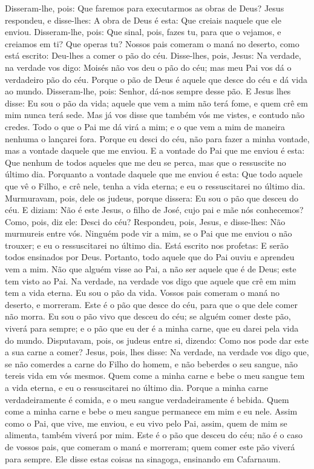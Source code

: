 Disseram-lhe, pois: Que faremos para executarmos as obras de
Deus? Jesus respondeu, e disse-lhes: A obra de Deus é esta:
Que creiais naquele que ele enviou. Disseram-lhe, pois: Que
sinal, pois, fazes tu, para que o vejamos, e creiamos em ti? Que
operas tu? Nossos pais comeram o maná no deserto, como está
escrito: Deu-lhes a comer o pão do céu. Disse-lhes, pois,
Jesus: Na verdade, na verdade vos digo: Moisés não vos deu o pão do
céu; mas meu Pai vos dá o verdadeiro pão do céu. Porque o pão
de Deus é aquele que desce do céu e dá vida ao mundo.
Disseram-lhe, pois: Senhor, dá-nos sempre desse pão. E
Jesus lhes disse: Eu sou o pão da vida; aquele que vem a mim não
terá fome, e quem crê em mim nunca terá sede. Mas já vos
disse que também vós me vistes, e contudo não credes. Todo o
que o Pai me dá virá a mim; e o que vem a mim de maneira nenhuma o
lançarei fora. Porque eu desci do céu, não para fazer a minha
vontade, mas a vontade daquele que me enviou. E a vontade do
Pai que me enviou é esta: Que nenhum de todos aqueles que me deu se
perca, mas que o ressuscite no último dia. Porquanto a
vontade daquele que me enviou é esta: Que todo aquele que vê o
Filho, e crê nele, tenha a vida eterna; e eu o ressuscitarei no
último dia. Murmuravam, pois, dele os judeus, porque dissera:
Eu sou o pão que desceu do céu. E diziam: Não é este Jesus, o
filho de José, cujo pai e mãe nós conhecemos? Como, pois, diz ele:
Desci do céu? Respondeu, pois, Jesus, e disse-lhes: Não
murmureis entre vós. Ninguém pode vir a mim, se o Pai que me
enviou o não trouxer; e eu o ressuscitarei no último dia.
Está escrito nos profetas: E serão todos ensinados por Deus.
Portanto, todo aquele que do Pai ouviu e aprendeu vem a mim.
Não que alguém visse ao Pai, a não ser aquele que é de Deus;
este tem visto ao Pai. Na verdade, na verdade vos digo que
aquele que crê em mim tem a vida eterna. Eu sou o pão da
vida. Vossos pais comeram o maná no deserto, e morreram.
Este é o pão que desce do céu, para que o que dele comer não
morra. Eu sou o pão vivo que desceu do céu; se alguém comer
deste pão, viverá para sempre; e o pão que eu der é a minha carne,
que eu darei pela vida do mundo. Disputavam, pois, os judeus
entre si, dizendo: Como nos pode dar este a sua carne a comer?
Jesus, pois, lhes disse: Na verdade, na verdade vos digo que,
se não comerdes a carne do Filho do homem, e não beberdes o seu
sangue, não tereis vida em vós mesmos. Quem come a minha
carne e bebe o meu sangue tem a vida eterna, e eu o ressuscitarei no
último dia. Porque a minha carne verdadeiramente é comida, e
o meu sangue verdadeiramente é bebida. Quem come a minha
carne e bebe o meu sangue permanece em mim e eu nele. Assim
como o Pai, que vive, me enviou, e eu vivo pelo Pai, assim, quem de
mim se alimenta, também viverá por mim. Este é o pão que
desceu do céu; não é o caso de vossos pais, que comeram o maná e
morreram; quem comer este pão viverá para sempre. Ele disse
estas coisas na sinagoga, ensinando em Cafarnaum.

